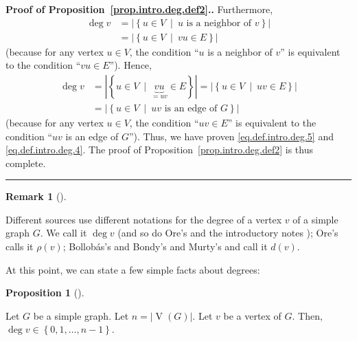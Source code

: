 \documentclass[numbers=enddot,12pt,final,onecolumn,notitlepage]{scrartcl}%
\theoremstyle{definition}
\newtheorem{prop}[theo]{Proposition}
\newenvironment{proposition}[1][]
{\begin{prop}[#1]\begin{leftbar}}
{\end{leftbar}\end{prop}}
\newtheorem{remk}[theo]{Remark}
\newenvironment{remark}[1][]
{\begin{remk}[#1]\begin{leftbar}}
{\end{leftbar}\end{remk}}
\newenvironment{proof}[1][Proof]{\noindent\textbf{#1.} }{\ \rule{0.5em}{0.5em}}
\newcommand{\set}[1]{\left\{ #1 \right\}}
\newcommand{\abs}[1]{\left| #1 \right|}
\newcommand{\verts}[1]{\operatorname{V}\left( #1 \right)}
\begin{document}
\begin{proof}[Proof of Proposition~\ref{prop.intro.deg.def2}.]
Furthermore,
\begin{align*}
\deg v &= \abs{\set{u \in V \ \mid \ u \text{ is a neighbor of } v }} \\
&= \abs{\set{u \in V \ \mid \ vu \in E }}
\end{align*}
(because for any vertex $u \in V$, the condition ``$u$ is a neighbor
of $v$'' is equivalent to the condition ``$vu \in E$''). Hence,
\begin{align*}
\deg v &= \abs{\set{u \in V \ \mid \ \underbrace{vu}_{=uv} \in E }}
= \abs{\set{u \in V \ \mid \ uv \in E }} \\
&= \abs{\set{u \in V \ \mid \ uv \text{ is an edge of } G }}
\end{align*}
(because for any vertex $u \in V$, the condition ``$uv \in E$'' is
equivalent to the condition ``$uv$ is an edge of $G$''). Thus, we
have proven \eqref{eq.def.intro.deg.5} and
\eqref{eq.def.intro.deg.4}. The proof of
Proposition~\ref{prop.intro.deg.def2} is thus complete.
\end{proof}

\begin{remark}
Different sources use different notations for the degree of a
vertex $v$ of a simple graph $G$. We call it $\deg v$ (and so do
Ore's \cite{Ore90} and the introductory notes
\cite{LeLeMe16}); Ore's \cite{Ore62} calls it $\rho\left(v\right)$;
Bollob\'as's \cite{Bollob79} and Bondy's and Murty's
\cite{BonMur08} and \cite{BonMur76} call it $d\left(v\right)$.
\end{remark}

At this point, we can state a few simple facts about degrees:

\begin{proposition} \label{prop.intro.deg.in-set}
Let $G$ be a simple graph. Let $n = \abs{\verts{G}}$. Let $v$ be a
vertex of $G$. Then, $\deg v \in \set{0, 1, \ldots, n-1}$.
\end{proposition}
\end{document}
